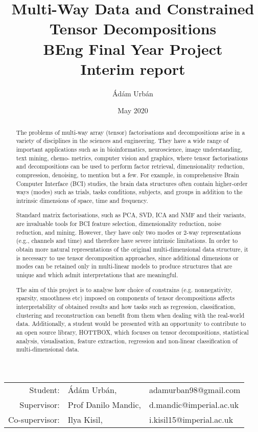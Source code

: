 \documentclass{article}
\title{ \textbf{Multi-Way Data and Constrained Tensor Decompositions} \\ BEng Final Year Project \\ Interim report}
\author{Ádám Urbán}
\date{May 2020}
\begin{document}
\maketitle

\begin{tabular}{rll}
Student: &Ádám Urbán, &adamurban98@gmail.com\\
Supervisor: &Prof Danilo Mandic, &d.mandic@imperial.ac.uk \\
Co-supervisor: &Ilya Kisil, &i.kisil15@imperial.ac.uk
\end{tabular}

\begin{abstract}
The problems of multi-way array (tensor) factorisations and decompositions arise in a variety of disciplines in the sciences and engineering. They have a wide range of important applications such as in bioinformatics, neuroscience, image understanding, text mining, chemo- metrics, computer vision and graphics, where tensor factorisations and decompositions can be used to perform factor retrieval, dimensionality reduction, compression, denoising, to mention but a few. For example, in comprehensive Brain Computer Interface (BCI) studies, the brain data structures often contain higher-order ways (modes) such as trials, tasks conditions, subjects, and groups in addition to the intrinsic dimensions of space, time and frequency.

Standard matrix factorisations, such as PCA, SVD, ICA and NMF and their variants, are invaluable tools for BCI feature selection, dimensionality reduction, noise reduction, and mining. However, they have only two modes or 2-way representations (e.g., channels and time) and therefore have severe intrinsic limitations. In order to obtain more natural representations of the original multi-dimensional data structure, it is necessary to use tensor decomposition approaches, since additional dimensions or modes can be retained only in multi-linear models to produce structures that are unique and which admit interpretations that are meaningful.

The aim of this project is to analyse how choice of constrains (e.g. nonnegativity, sparsity, smoothness etc) imposed on components of tensor decompositions affects interpretability of obtained results and how tasks such as regression, classification, clustering and reconstruction can benefit from them when dealing with the real-world data. Additionally, a student would be presented with an opportunity to contribute to an open source library, HOTTBOX, which focuses on tensor decompositions, statistical analysis, visualisation, feature extraction, regression and non-linear classification of multi-dimensional data.
\end{abstract}
\end{document}
